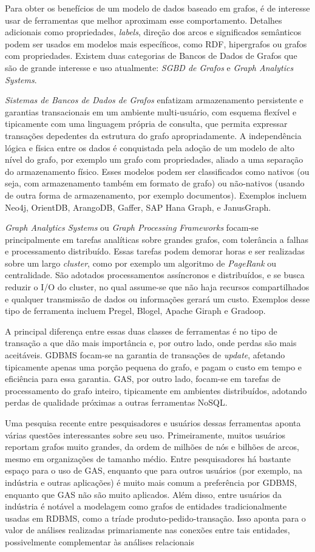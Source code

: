 
Para obter os benefícios de um modelo de dados baseado em grafos, é de
interesse usar de ferramentas que melhor aproximam esse comportamento. Detalhes
adicionais como propriedades, \emph{labels}, direção dos arcos e significados
semânticos podem ser usados em modelos mais específicos, como RDF, hipergrafos
ou grafos com propriedades. Existem duas categorias de Bancos de Dados de
Grafos que são de grande interesse e uso atualmente:
\emph{SGBD de Grafos} e \emph{Graph Analytics Systems}.

\emph{Sistemas de Bancos de Dados de Grafos} enfatizam armazenamento
persistente e garantias transacionais em um ambiente multi-usuário, com esquema
flexível e tipicamente com uma linguagem própria de consulta, que permita
expressar transações depedentes da estrutura do grafo apropriadamente. A
independência lógica e física entre os dados é conquistada pela adoção de um
modelo de alto nível do grafo, por exemplo um grafo com propriedades, aliado a
uma separação do armazenamento físico. Esses modelos podem ser classificados
como nativos (ou seja, com armazenamento também em formato de grafo) ou
não-nativos (usando de outra forma de armazenamento, por exemplo documentos).
Exemplos incluem Neo4j, OrientDB, ArangoDB, Gaffer, SAP Hana Graph, e JanusGraph.

\emph{Graph Analytics Systems} ou \emph{Graph Processing Frameworks} focam-se
principalmente em tarefas analíticas sobre grandes grafos, com tolerância a
falhas e processamento distribuído. Essas tarefas podem demorar horas e ser
realizadas sobre um largo \emph{cluster}, como por exemplo um algoritmo de
\emph{PageRank} ou centralidade. São adotados processamentos assíncronos e
distribuídos, e se busca reduzir o I/O do cluster, no qual assume-se que não
haja recursos compartilhados e qualquer transmissão de dados ou informações
gerará um custo. Exemplos desse tipo de ferramenta incluem Pregel, Blogel,
Apache Giraph e Gradoop.

A principal diferença entre essas duas classes de ferramentas é no tipo de
transação a que dão mais importância e, por outro lado, onde perdas são mais
aceitáveis. GDBMS focam-se na garantia de transações de \emph{update}, afetando
tipicamente apenas uma porção pequena do grafo, e pagam o custo em tempo e
eficiência para essa garantia. GAS, por outro lado, focam-se em tarefas de
processamento do grafo inteiro, tipicamente em ambientes distribuídos, adotando
perdas de qualidade próximas a outras ferramentas NoSQL.

Uma pesquisa recente entre pesquisadores e usuários dessas ferramentas
\cite{sahu} aponta várias questões interessantes sobre seu uso. Primeiramente,
muitos usuários reportam grafos muito grandes, da ordem de milhões de nós e
bilhões de arcos, mesmo em organizações de tamanho médio. Entre pesquisadores
há bastante espaço para o uso de GAS, enquanto que para outros usuários
(por exemplo, na indústria e outras aplicações) é muito mais comum a
preferência por GDBMS, enquanto que GAS não são muito aplicados. Além disso,
entre usuários da indústria é notável a modelagem como grafos de entidades
tradicionalmente usadas em RDBMS, como a tríade
{\ttfamily produto-pedido-transação}. Isso aponta para o valor de análises
realizadas primariamente nas conexões entre tais entidades, possivelmente
complementar às análises relacionais
